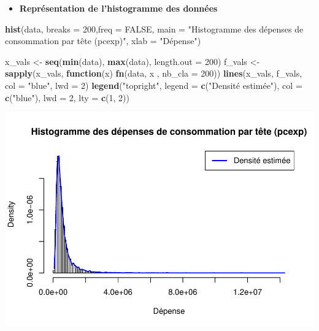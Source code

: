 \documentclass[
  12pt,
]{article}
\newenvironment{Shaded}{\begin{snugshade}}{\end{snugshade}}
\newcommand{\AttributeTok}[1]{\textcolor[rgb]{0.13,0.29,0.53}{#1}}
\newcommand{\ConstantTok}[1]{\textcolor[rgb]{0.56,0.35,0.01}{#1}}
\newcommand{\ControlFlowTok}[1]{\textcolor[rgb]{0.13,0.29,0.53}{\textbf{#1}}}
\newcommand{\DecValTok}[1]{\textcolor[rgb]{0.00,0.00,0.81}{#1}}
\newcommand{\FunctionTok}[1]{\textcolor[rgb]{0.13,0.29,0.53}{\textbf{#1}}}
\newcommand{\NormalTok}[1]{#1}
\newcommand{\OtherTok}[1]{\textcolor[rgb]{0.56,0.35,0.01}{#1}}
\newcommand{\StringTok}[1]{\textcolor[rgb]{0.31,0.60,0.02}{#1}}
\providecommand{\tightlist}{%
  \setlength{\itemsep}{0pt}\setlength{\parskip}{0pt}}
\begin{document}
\begin{itemize}
\tightlist
\item
  \textbf{Représentation de l'histogramme des données}
\end{itemize}

\begin{Shaded}
\begin{Highlighting}[]
\FunctionTok{hist}\NormalTok{(data, }\AttributeTok{breaks =} \DecValTok{200}\NormalTok{,}\AttributeTok{freq =} \ConstantTok{FALSE}\NormalTok{, }\AttributeTok{main =} \StringTok{"Histogramme des dépenses de consommation par tête (pcexp)"}\NormalTok{, }\AttributeTok{xlab =} \StringTok{"Dépense"}\NormalTok{)}

\NormalTok{x\_vals }\OtherTok{\textless{}{-}} \FunctionTok{seq}\NormalTok{(}\FunctionTok{min}\NormalTok{(data), }\FunctionTok{max}\NormalTok{(data), }\AttributeTok{length.out =} \DecValTok{200}\NormalTok{)}
\NormalTok{f\_vals }\OtherTok{\textless{}{-}} \FunctionTok{sapply}\NormalTok{(x\_vals, }\ControlFlowTok{function}\NormalTok{(x) }\FunctionTok{fn}\NormalTok{(data, x , }\AttributeTok{nb\_cla =} \DecValTok{200}\NormalTok{))}
\FunctionTok{lines}\NormalTok{(x\_vals, f\_vals, }\AttributeTok{col =} \StringTok{"blue"}\NormalTok{, }\AttributeTok{lwd =} \DecValTok{2}\NormalTok{)}
\FunctionTok{legend}\NormalTok{(}\StringTok{"topright"}\NormalTok{, }\AttributeTok{legend =} \FunctionTok{c}\NormalTok{(}\StringTok{"Densité estimée"}\NormalTok{), }\AttributeTok{col =} \FunctionTok{c}\NormalTok{(}\StringTok{"blue"}\NormalTok{), }\AttributeTok{lwd =} \DecValTok{2}\NormalTok{, }\AttributeTok{lty =} \FunctionTok{c}\NormalTok{(}\DecValTok{1}\NormalTok{, }\DecValTok{2}\NormalTok{))}
\end{Highlighting}
\end{Shaded}

\includegraphics{Stat_non_para_files/figure-latex/unnamed-chunk-176-1.pdf}
\end{document}
